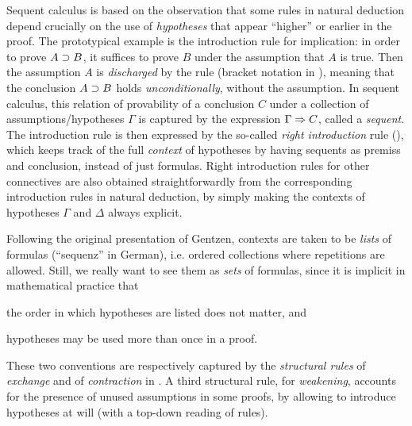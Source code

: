 Sequent calculus is based on the observation that some rules in natural
deduction depend crucially on the use of \emph{hypotheses} that appear
``higher'' or earlier in the proof. The prototypical example is the introduction
rule  for implication: in order to prove $A \supset B$, it suffices
to prove $B$ under the assumption that $A$ is true. Then the assumption $A$ is
\emph{discharged} by the rule (bracket notation in ), meaning
that the conclusion $A \supset B$ holds \emph{unconditionally}, without the
assumption. In sequent calculus, this relation of provability of a conclusion
$C$ under a collection of assumptions/hypotheses $\Gamma$ is captured by the
expression $\Gamma \Rightarrow C$, called a \emph{sequent}. The introduction rule
 is then expressed by the so-called \emph{right introduction} rule
 (), which keeps track of the full
\emph{context} of hypotheses by having sequents as premiss and conclusion,
instead of just formulas. Right introduction rules for other connectives are
also obtained straightforwardly from the corresponding introduction rules in
natural deduction, by simply making the contexts of hypotheses $\Gamma$ and
$\Delta$ always explicit.

Following the original presentation of Gentzen, contexts are taken to be
\emph{lists} of formulas (``sequenz'' in German), i.e. ordered collections where
repetitions are allowed. Still, we really want to see them as \emph{sets} of
formulas, since it is implicit in mathematical practice that \begin{enumerate*}
\item the order in which hypotheses are listed does not matter, and \item
hypotheses may be used more than once in a proof. \end{enumerate*} These two
conventions are respectively captured by the \emph{structural rules}  of
\emph{exchange} and  of \emph{contraction} in . A
third structural rule,  for \emph{weakening}, accounts for the presence
of unused assumptions in some proofs, by allowing to introduce hypotheses at
will (with a top-down reading of rules).

